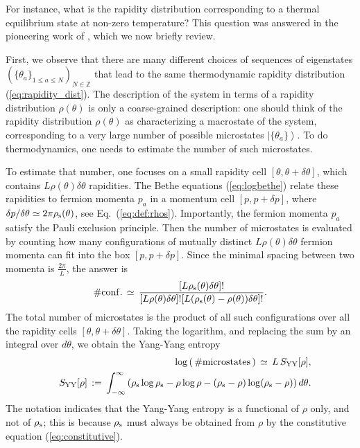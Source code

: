 \documentclass[onecolumn,amsfonts,showpacs,superscriptaddress]{revtex4-1}
\begin{document}
For instance, what is the rapidity distribution corresponding to a thermal equilibrium state at non-zero temperature? This question was answered in the pioneering work of  \cite{yang1969thermodynamics}, which we now briefly review.

First, we observe that there are many different choices of sequences of eigenstates $(\{ \theta_a \}_{1 \leq a \leq N} )_{N \in \mathbb{Z}}$ that lead to the same thermodynamic rapidity distribution (\ref{eq:rapidity_dist}). The description of the system in terms of a rapidity distribution $\rho(\theta)$ is only a coarse-grained description: one should think of the rapidity distribution $\rho(\theta)$ as characterizing a macrostate of the system, corresponding to a very large number of possible microstates $\left| \{ \theta_a\} \right>$. To do thermodynamics, one needs to estimate the number of such microstates.

To estimate that number, one focuses on a small rapidity cell $[\theta, \theta + \delta \theta]$, which contains $L \rho(\theta) \delta \theta$ rapidities. The Bethe equations (\ref{eq:logbethe}) relate these rapidities to fermion momenta $p_a$ in a momentum cell $[p , p + \delta p]$, where $\delta p/ \delta \theta \simeq 2\pi \rho_{\rm s}(\theta)$, see Eq.~(\ref{eq:def:rhos}). Importantly, the fermion momenta $p_a$ satisfy the Pauli exclusion principle. Then the number of microstates is evaluated by counting how many configurations of mutually distinct $L \rho(\theta) \delta \theta$ fermion momenta can fit into the box $[p , p + \delta p]$. Since the minimal spacing between two momenta is $\frac{2\pi}{L}$, the answer is
\begin{equation}
    \label{eq:SYY}
   \# {\rm conf.} \, \simeq \, \frac{[L \rho_{\rm s}(\theta) \delta \theta] !}{[L \rho(\theta) \delta \theta] ! [L (\rho_{\rm s}(\theta)- \rho(\theta)) \delta \theta] !} .
\end{equation}
The total number of microstates is the product of all such configurations over all the rapidity cells $[\theta, \theta+\delta \theta]$. Taking the logarithm, and replacing the sum by an integral over $d\theta$, we obtain the Yang-Yang entropy
\begin{eqnarray}
\nonumber  && \log \left( \, \# {\rm microstates} \, \right) \, \simeq \, L \, S_{\rm YY}[\rho] , \\
  &&   S_{\rm YY}[\rho] \, := \, \int_{-\infty}^\infty \left( \rho_{\rm s} \log \rho_{\rm s} - \rho \log \rho - ( \rho_{\rm s}-\rho) \log ( \rho_{\rm s} - \rho) \right) d\theta  .
\end{eqnarray}
The notation indicates that the Yang-Yang entropy is a functional of $\rho$ only, and not of $\rho_{\rm s}$; this is because $\rho_{\rm s}$ must always be obtained from $\rho$ by the constitutive equation (\ref{eq:constitutive}).
\end{document}
